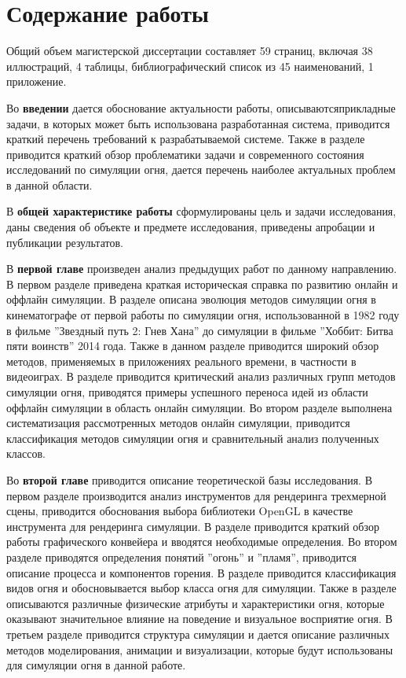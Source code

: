 \part*{Содержание работы}

Общий объем магистерской диссертации составляет 59 страниц, включая 38
иллюстраций, 4 таблицы, библиографический список из 45 наименований, 1
приложение.

Во \textbf{введении} дается обоснование актуальности работы,
описываются\break{}прикладные задачи, в которых может быть использована
разработанная система, приводится краткий перечень требований к разрабатываемой
системе. Также в разделе приводится краткий обзор проблематики задачи и
современного состояния исследований по симуляции огня, дается перечень наиболее
актуальных проблем в данной области.

В \textbf{общей характеристике работы} сформулированы цель и задачи
исследования, даны сведения об объекте и предмете исследования, приведены
апробации и публикации результатов.

В \textbf{первой главе} произведен анализ предыдущих работ по данному
направлению. В первом разделе приведена краткая историческая справка по развитию
онлайн и оффлайн симуляции. В разделе описана эволюция методов симуляции огня в
кинематографе от первой работы по симуляции огня, использованной в 1982 году в
фильме ''Звездный путь 2: Гнев Хана'' до симуляции в фильме ''Хоббит: Битва пяти
воинств'' 2014 года. Также в данном разделе приводится широкий обзор методов,
применяемых в приложениях реального времени, в частности в видеоиграх. В разделе
приводится критический анализ различных групп методов симуляции огня, приводятся
примеры успешного переноса идей из области оффлайн симуляции в область онлайн
симуляции. Во втором разделе выполнена систематизация рассмотренных методов
онлайн симуляции, приводится классификация методов симуляции огня и
сравнительный анализ полученных классов.

Во \textbf{второй главе} приводится описание теоретической базы исследования.
В первом разделе производится анализ инструментов для рендеринга трехмерной
сцены, приводится обоснования выбора библиотеки OpenGL в качестве инструмента
для рендеринга симуляции. В разделе приводится краткий обзор работы графического
конвейера и вводятся необходимые определения. Во втором разделе
приводятся определения понятий ''огонь'' и ''пламя'', приводится описание
процесса и компонентов горения. В разделе приводится
классификация видов огня и обосновывается выбор класса огня для симуляции. Также
в разделе описываются различные физические атрибуты и характеристики огня,
которые оказывают значительное влияние на поведение и визуальное восприятие
огня. В третьем разделе приводится структура симуляции и дается описание
различных методов моделирования, анимации и визуализации, которые будут
использованы для симуляции огня в данной работе.


